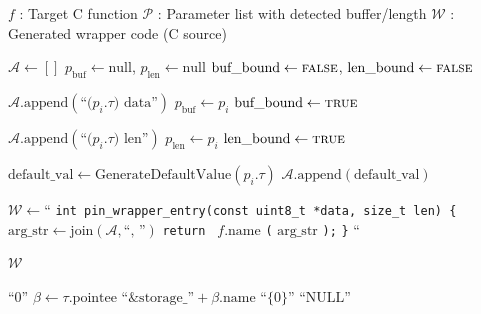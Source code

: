 \vspace{0.5cm}

\begin{algorithm}[H]
\caption{Pass-Through Wrapper Generation}
\label{alg:pass_through_wrapper}
\begin{algorithmic}[1]
\REQUIRE $f$ : Target C function
\REQUIRE $\mathcal{P}$ : Parameter list with detected buffer/length
\ENSURE $\mathcal{W}$ : Generated wrapper code (C source)

    \STATE $\mathcal{A} \leftarrow []$ 
    \STATE $p_{\text{buf}} \leftarrow \text{null}$, $p_{\text{len}} \leftarrow \text{null}$
    \STATE $\text{buf\_bound} \leftarrow \textsc{false}$, $\text{len\_bound} \leftarrow \textsc{false}$

    \STATE {}
            \STATE $\mathcal{A}.\text{append}(\text{``(} p_i.\tau \text{) data''})$
            \STATE $p_{\text{buf}} \leftarrow p_i$
            \STATE $\text{buf\_bound} \leftarrow \textsc{true}$

            \STATE $\mathcal{A}.\text{append}(\text{``(} p_i.\tau \text{) len''})$
            \STATE $p_{\text{len}} \leftarrow p_i$
            \STATE $\text{len\_bound} \leftarrow \textsc{true}$

        \ELSE
            \STATE $\text{default\_val} \leftarrow \text{GenerateDefaultValue}(p_i.\tau)$
            \STATE $\mathcal{A}.\text{append}(\text{default\_val})$
        \ENDIF
    \ENDFOR

    \STATE {}
    \STATE $\mathcal{W} \leftarrow \text{``}$
    \STATE \quad \texttt{int pin\_wrapper\_entry(const uint8\_t *data, size\_t len) \{}
    \STATE \quad \quad $\text{arg\_str} \leftarrow \text{join}(\mathcal{A}, \text{``, ''})$
    \STATE \quad \quad \texttt{return } $f.\text{name}$ \texttt{(} $\text{arg\_str}$ \texttt{);}
    \STATE \quad \texttt{\}}
    \STATE $\text{``}$

    \RETURN $\mathcal{W}$
\ENDPROCEDURE

\vspace{0.3cm}

        \RETURN $\text{``0''}$
        \STATE $\beta \leftarrow \tau.\text{pointee}$
        \RETURN $\text{``\&storage\_''} + \beta.\text{name}$ 
        \RETURN $\text{``\{0\}''}$ 
    \ELSE
        \RETURN $\text{``NULL''}$
    \ENDIF
\ENDPROCEDURE

\end{algorithmic}
\end{algorithm}


